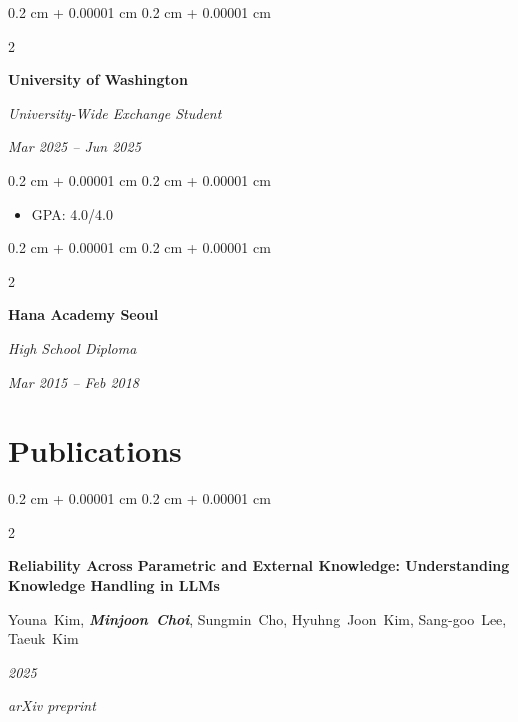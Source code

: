 \documentclass[10pt, letterpaper]{article}
\newenvironment{highlights}{
    \begin{itemize}[
        topsep=0.10 cm,
        parsep=0.10 cm,
        partopsep=0pt,
        itemsep=0pt,
        leftmargin=0.4 cm + 10pt
    ]
}{
    \end{itemize}
} %
\newenvironment{onecolentry}{
    \begin{adjustwidth}{
        0.2 cm + 0.00001 cm
    }{
        0.2 cm + 0.00001 cm
    }
}{
    \end{adjustwidth}
} %
\newenvironment{twocolentry}[2][]{
    \onecolentry
    \def\secondColumn{#2}
    \setcolumnwidth{\fill, 4.5 cm}
    \begin{paracol}{2}
}{
    \switchcolumn \raggedleft \secondColumn
    \end{paracol}
    \endonecolentry
} %
\let\hrefWithoutArrow\href
\renewcommand{\href}[2]{\hrefWithoutArrow{#1}{\ifthenelse{\equal{#2}{}}{ }{#2 }\raisebox{.15ex}{\footnotesize \faExternalLink*}}}
\begin{document}
        \vspace{0.3 cm}

        \begin{twocolentry}{
            \textit{Mar 2025 – Jun 2025}}
            \textbf{University of Washington}

            \textit{University-Wide Exchange Student}
        \end{twocolentry}

        \vspace{0.10 cm}
        \begin{onecolentry}
            \begin{highlights}
                \item GPA: 4.0/4.0
            \end{highlights}
        \end{onecolentry}

        \vspace{0.3 cm}

        \begin{twocolentry}{
            \textit{Mar 2015 – Feb 2018}}
            \textbf{Hana Academy Seoul}

            \textit{High School Diploma}
        \end{twocolentry}


    \section{Publications}

        \begin{twocolentry}{
        \textit{2025}    
            
        \textit{arXiv preprint}}
            \textbf{Reliability Across Parametric and External Knowledge: Understanding Knowledge Handling in LLMs}

            \vspace{0.10 cm}

            \mbox{Youna Kim}, \mbox{\textbf{\textit{Minjoon Choi}}}, \mbox{Sungmin Cho}, \mbox{Hyuhng Joon Kim}, \mbox{Sang-goo Lee}, \mbox{Taeuk Kim}
        \end{twocolentry}


\end{document}
